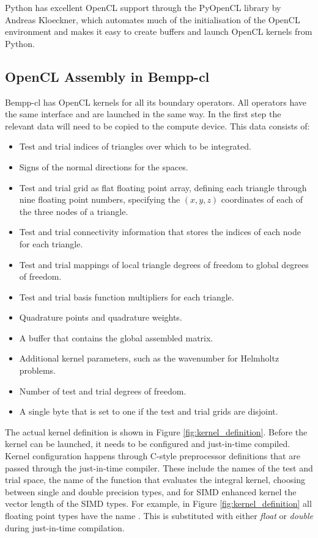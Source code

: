 Python has excellent OpenCL support through the PyOpenCL library by Andreas Kloeckner, which automates much of the initialisation of the OpenCL environment and makes it easy to create buffers and launch OpenCL kernels from Python.

\subsection{OpenCL Assembly in Bempp-cl}

\begin{figure*}
	\center
	
	\caption{Definition of the OpenCL compute kernel for scalar integral equations.}
	\label{fig:kernel_definition}
\end{figure*}


Bempp-cl has OpenCL kernels for all its boundary operators. All operators have the same interface and are launched in the same way. In the first step the relevant data will need to be copied to the compute device. This data consists of:

\begin{itemize}
	\item Test and trial indices of triangles over which to be integrated.
	\item Signs of the normal directions for the spaces.
	\item Test and trial grid as flat floating point array, defining each triangle through nine floating point numbers, specifying the $(x, y, z)$ coordinates of each of the three nodes of a triangle.
	\item Test and trial connectivity information that stores the indices of each node for each triangle.
	\item Test and trial mappings of local triangle degrees of freedom to global degrees of freedom.
	\item Test and trial basis function multipliers for each triangle.
	\item Quadrature points and quadrature weights.
	\item A buffer that contains the global assembled matrix.
	\item Additional kernel parameters, such as the wavenumber for Helmholtz problems.
	\item Number of test and trial degrees of freedom.
	\item A single byte that is set to one if the test and trial grids are disjoint.
\end{itemize}
The actual kernel definition is shown in Figure \ref{fig:kernel_definition}.
Before the kernel can be launched, it needs to be configured and just-in-time compiled. Kernel configuration happens through C-style preprocessor definitions that are passed through the just-in-time compiler. These include the names of the test and trial space, the name of the function that evaluates the integral kernel, choosing between single and double precision types, and for SIMD enhanced kernel the vector length of the SIMD types.
For example, in Figure \ref{fig:kernel_definition} all floating point types have the name . This is substituted with either \textit{float} or \textit{double} during just-in-time compilation.

